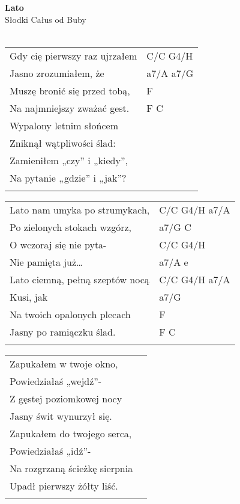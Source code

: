 \documentclass[a5paper]{article}
\begin{document}


\noindent
\fontsize{12pt}{15pt}\selectfont
\textbf{Lato} \\
\fontsize{8pt}{10pt}\selectfont
Słodki Całus od Buby \\ \\
\fontsize{10pt}{12pt}\selectfont
{}
\begin{tabular}{@{}p{7.50cm}p{3cm}@{}}
\noindent
Gdy cię pierwszy raz ujrzałem & C/C G4/H \\
Jasno zrozumiałem, że & a7/A a7/G \\
Muszę bronić się przed tobą, & F \\
Na najmniejszy zważać gest. & F C \\
Wypalony letnim słońcem \\
Zniknął wątpliwości ślad: \\
Zamieniłem „czy” i „kiedy”, \\
Na pytanie „gdzie” i „jak”? \\ \\
\end{tabular}

\noindent
\begin{tabular}{@{}p{6.50cm}p{3cm}@{}}
Lato nam umyka po strumykach, & C/C G4/H a7/A \\
Po zielonych stokach wzgórz, & a7/G C \\
O wczoraj się nie pyta- & C/C G4/H \\
Nie pamięta już… & a7/A e \\
Lato ciemną, pełną szeptów nocą & C/C G4/H a7/A \\
Kusi, jak & a7/G \\
Na twoich opalonych plecach	& F \\
Jasny po ramiączku ślad. & F C \\ \\
\end{tabular}

\noindent
\begin{tabular}{@{}p{7.50cm}p{3cm}@{}}
Zapukałem w twoje okno, \\
Powiedziałaś „wejdź”- \\
Z gęstej poziomkowej nocy \\
Jasny świt wynurzył się. \\
Zapukałem do twojego serca, \\
Powiedziałaś „idź”- \\
Na rozgrzaną ścieżkę sierpnia \\
Upadł pierwszy żółty liść. \\ \\
\end{tabular}
\end{document}
